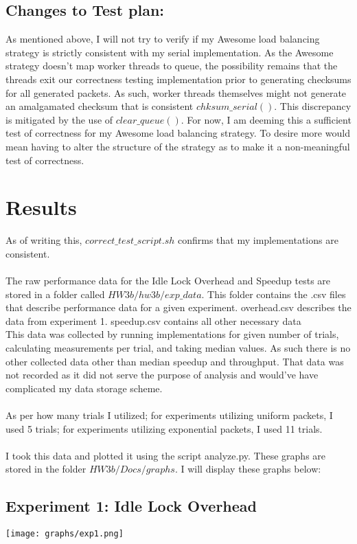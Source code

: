 \documentclass[]{article}
\begin{document}
\subsection{Changes to Test plan:}
As mentioned above, I will not try to verify if my Awesome load balancing strategy is strictly consistent with my serial implementation. As the Awesome strategy doesn't map worker threads to queue, the possibility remains that the threads exit our correctness testing implementation prior to generating checksums for all generated packets. As such, worker threads themselves might not generate an amalgamated checksum that is consistent $chksum\_serial()$. This discrepancy is mitigated by the use of $clear\_queue()$. For now, I am deeming this a sufficient test of correctness for my Awesome load balancing strategy. To desire more would mean having to alter the structure of the strategy as to make it a non-meaningful test of correctness.
\section{Results}
As of writing this, $correct\_test\_script.sh$ confirms that my implementations are consistent.
\\\\
The raw performance data for the Idle Lock Overhead and Speedup tests are stored in a folder called $HW3b/hw3b/exp\_data$. This folder contains the .csv files that describe performance data for a given experiment. overhead.csv describes the data from experiment 1. speedup.csv contains all other necessary data
\\
This data was collected by running implementations for given number of trials, calculating measurements per trial, and taking median values. As such there is no other collected data other than median speedup and throughput. That data was not recorded as it did not serve the purpose of analysis and would've have complicated my data storage scheme.
\\\\
As per how many trials I utilized; for experiments utilizing uniform packets, I used 5 trials; for experiments utilizing exponential packets, I used 11 trials.
\\\\
I took this data and plotted it using the script analyze.py. These graphs are stored in the folder $HW3b/Docs/graphs$. I will display these graphs below:

\subsection{Experiment 1: Idle Lock Overhead}
\texttt{[image: graphs/exp1.png]}\\
\end{document}
